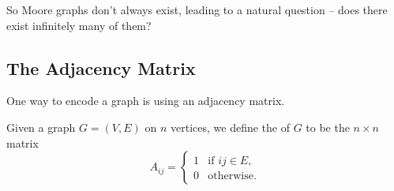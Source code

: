 So Moore graphs don't always exist, leading to a natural question -- does there exist infinitely many of them?


\subsection{The Adjacency Matrix}

One way to encode a graph is using an adjacency matrix.

\begin{definition}
	Given a graph $G = (V, E)$ on $n$ vertices, we define the  of $G$ to be the $n \times n$ matrix
	$$
	A_{ij} = \begin{cases}
		1 &\mbox{if } ij \in E, \\
		0 &\mbox{otherwise}.
	   \end{cases}
	$$
\end{definition}

